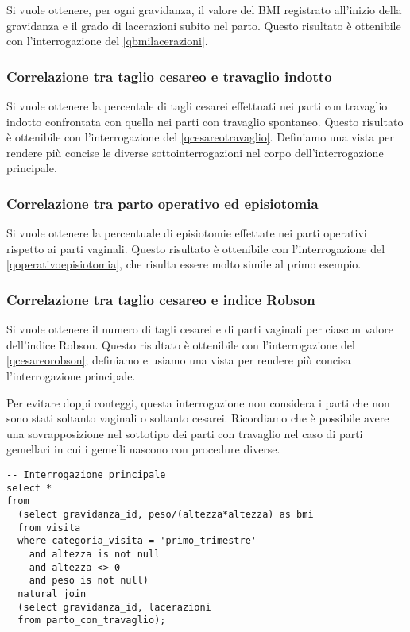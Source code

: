 Si vuole ottenere, per ogni gravidanza, il valore del BMI registrato all'inizio della gravidanza e il grado di lacerazioni subito nel parto.
Questo risultato è ottenibile con l'interrogazione del \lstlistingname{} \ref{qbmilacerazioni}.

\subsubsection{Correlazione tra taglio cesareo e travaglio indotto}

Si vuole ottenere la percentale di tagli cesarei effettuati nei parti con travaglio indotto confrontata con quella nei parti con travaglio spontaneo.
Questo risultato è ottenibile con l'interrogazione del \lstlistingname{} \ref{qcesareotravaglio}.
Definiamo una vista  per rendere più concise le diverse sottointerrogazioni nel corpo dell'interrogazione principale.

\subsubsection{Correlazione tra parto operativo ed episiotomia}

Si vuole ottenere la percentuale di episiotomie effettate nei parti operativi rispetto ai parti vaginali.
Questo risultato è ottenibile con l'interrogazione del \lstlistingname{} \ref{qoperativoepisiotomia}, che risulta essere molto simile al primo esempio.

\subsubsection{Correlazione tra taglio cesareo e indice Robson}

Si vuole ottenere il numero di tagli cesarei e di parti vaginali per ciascun valore dell'indice Robson.
Questo risultato è ottenibile con l'interrogazione del \lstlistingname{} \ref{qcesareorobson}; definiamo e usiamo una vista  per rendere più concisa l'interrogazione principale.

Per evitare doppi conteggi, questa interrogazione non considera i parti che non sono stati soltanto vaginali o soltanto cesarei.
Ricordiamo che è possibile avere una sovrapposizione nel sottotipo dei parti con travaglio nel caso di parti gemellari in cui i gemelli nascono con procedure diverse.

\begin{lstlisting}[float,caption={Esempio di interrogazione. Valori di BMI e lacerazioni.},label=qbmilacerazioni]
-- Interrogazione principale
select *
from
  (select gravidanza_id, peso/(altezza*altezza) as bmi
  from visita
  where categoria_visita = 'primo_trimestre'
    and altezza is not null
    and altezza <> 0
    and peso is not null)
  natural join
  (select gravidanza_id, lacerazioni
  from parto_con_travaglio);
\end{lstlisting}

